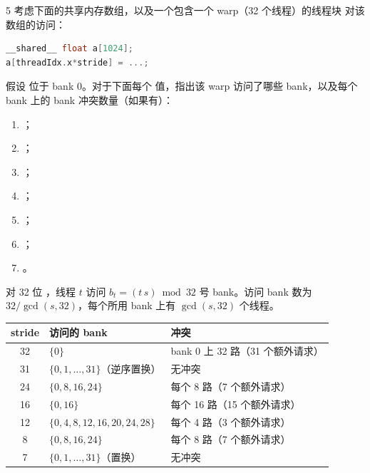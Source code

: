 \begin{solutionexercise}{5}
\problemheading 考虑下面的共享内存数组，以及一个包含一个 warp（32 个线程）的线程块
对该数组的访问：
\begin{lstlisting}[language=C++,numbers=none]
__shared__ float a[1024];
a[threadIdx.x*stride] = ...;
\end{lstlisting}
假设  位于 bank 0。对于下面每个  值，指出该 warp
访问了哪些 bank，以及每个 bank 上的 bank 冲突数量（如果有）：
\begin{enumerate}[label=\alph*.,leftmargin=2.2em]
  \item {}；
  \item {}；
  \item {}；
  \item {}；
  \item {}；
  \item {}；
  \item {}。
\end{enumerate}

\approachheading 对 32 位 ，线程 $t$ 访问
$b_t=(t\,s)\bmod32$ 号 bank。访问 bank 数为 $32/\gcd(s,32)$，每个所用 bank 上有
$\gcd(s,32)$ 个线程。

\answerheading
\begin{center}
\begin{tabular}{c@{\quad}l@{\quad}l}
\toprule
stride & 访问的 bank & 冲突\\
\midrule
32 & $\{0\}$ & bank 0 上 32 路（31 个额外请求）\\
31 & $\{0,1,\ldots,31\}$（逆序置换） & 无冲突\\
24 & $\{0,8,16,24\}$ & 每个 8 路（7 个额外请求）\\
16 & $\{0,16\}$ & 每个 16 路（15 个额外请求）\\
12 & $\{0,4,8,12,16,20,24,28\}$ & 每个 4 路（3 个额外请求）\\
8  & $\{0,8,16,24\}$ & 每个 8 路（7 个额外请求）\\
7  & $\{0,1,\ldots,31\}$（置换） & 无冲突\\
\bottomrule
\end{tabular}
\end{center}


\end{solutionexercise}
